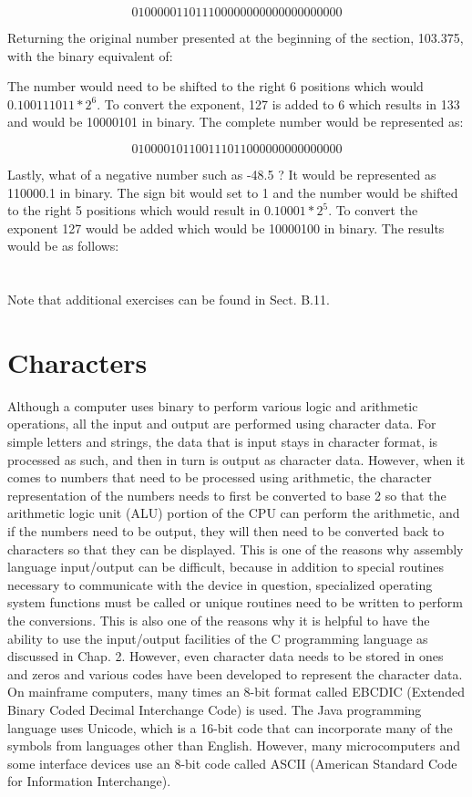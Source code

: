\documentclass[10pt]{book}
\begin{document}
$$
010000011011100000000000000000000
$$

Returning the original number presented at the beginning of the section, 103.375, with the binary equivalent of:

The number would need to be shifted to the right 6 positions which would $0.100111011 * 2^{6}$. To convert the exponent, 127 is added to 6 which results in 133 and would be 10000101 in binary. The complete number would be represented as:

$$
010000101100111011000000000000000
$$

Lastly, what of a negative number such as -48.5 ? It would be represented as 110000.1 in binary. The sign bit would set to 1 and the number would be shifted to the right 5 positions which would result in $0.10001 * 2^{5}$. To convert the exponent 127 would be added which would be 10000100 in binary. The results would be as follows:

\section{}
Note that additional exercises can be found in Sect. B.11.

\section{Characters}
Although a computer uses binary to perform various logic and arithmetic operations, all the input and output are performed using character data. For simple letters and strings, the data that is input stays in character format, is processed as such, and then in turn is output as character data. However, when it comes to numbers that need to be processed using arithmetic, the character representation of the numbers needs to first be converted to base 2 so that the arithmetic logic unit (ALU) portion of the CPU can perform the arithmetic, and if the numbers need to be output, they will then need to be converted back to characters so that they can be displayed. This is one of the reasons why assembly language input/output can be difficult, because in addition to special routines necessary to communicate with the device in question, specialized operating system functions must be called or unique routines need to be written to perform the conversions. This is also one of the reasons why it is helpful to have the ability to use the input/output facilities of the C programming language as discussed in Chap. 2. However, even character data needs to be stored in ones and zeros and various codes have been developed to represent the character data. On mainframe computers, many times an 8-bit format called EBCDIC (Extended Binary Coded Decimal Interchange Code) is used. The Java programming language uses Unicode, which is a 16-bit code that can incorporate many of the symbols from languages other than English. However, many microcomputers and some interface devices use an 8-bit code called ASCII (American Standard Code for Information Interchange).
\end{document}
